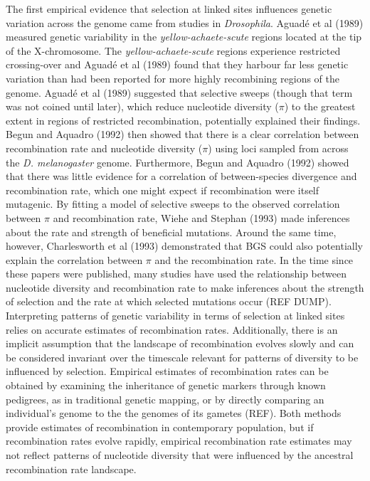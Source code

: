\documentclass[11pt,twoside,lineno]{GSA_format}
\begin{document}
The first empirical evidence that selection at linked sites influences genetic variation across the genome came from studies in \textit{Drosophila}. Aguadé et al (1989) measured genetic variability in the \textit{yellow-achaete-scute} regions located at the tip of the X-chromosome. The \textit{yellow-achaete-scute} regions experience restricted crossing-over and Aguadé et al (1989) found that they harbour far less genetic variation than had been reported for more highly recombining regions of the genome. Aguadé et al (1989) suggested that selective sweeps (though that term was not coined until later), which reduce nucleotide diversity ($\pi$) to the greatest extent in regions of restricted recombination, potentially explained their findings. Begun and Aquadro (1992) then showed that there is a clear correlation between recombination rate and nucleotide diversity ($\pi$) using loci sampled from across the \textit{D. melanogaster} genome. Furthermore, Begun and Aquadro (1992) showed that there was little evidence for a correlation of between-species divergence and recombination rate, which one might expect if recombination were itself mutagenic. By fitting a model of selective sweeps to the observed correlation between $\pi$ and recombination rate, Wiehe and Stephan (1993) made inferences about the rate and strength of beneficial mutations. Around the same time, however, Charlesworth et al (1993) demonstrated that BGS could also potentially explain the correlation between $\pi$ and the recombination rate. In the time since these papers were published, many studies have used the relationship between nucleotide diversity and recombination rate to make inferences about the strength of selection and the rate at which selected mutations occur (REF DUMP). \\

Interpreting patterns of genetic variability in terms of selection at linked sites relies on accurate estimates of recombination rates. Additionally, there is an implicit assumption that the landscape of recombination evolves slowly and can be considered invariant over the timescale relevant for patterns of diversity to be influenced by selection. Empirical estimates of recombination rates can be obtained by examining the inheritance of genetic markers through known pedigrees, as in traditional genetic mapping, or by directly comparing an individual's genome to the the genomes of its gametes (REF). Both methods provide estimates of recombination in contemporary population, but if recombination rates evolve rapidly, empirical recombination rate estimates may not reflect patterns of nucleotide diversity that were influenced by the ancestral recombination rate landscape.\\
\end{document}
